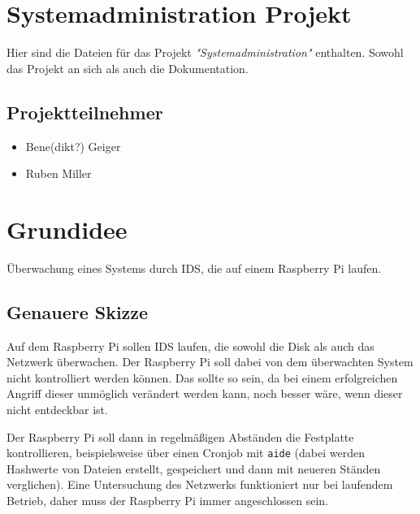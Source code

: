 \documentclass{article}
\begin{document}
\section{Systemadministration Projekt}

Hier sind die Dateien für das Projekt \textit{"Systemadministration"} enthalten. Sowohl das Projekt an sich als auch die Dokumentation.

\subsection{Projektteilnehmer}
\begin{itemize}
    \item Bene(dikt?) Geiger
    \item Ruben Miller
\end{itemize}

\section{Grundidee}

Überwachung eines Systems durch IDS, die auf einem Raspberry Pi laufen.

\subsection{Genauere Skizze}

Auf dem Raspberry Pi sollen IDS laufen, die sowohl die Disk als auch das Netzwerk überwachen. Der Raspberry Pi soll dabei von dem überwachten System nicht kontrolliert werden können. Das sollte so sein, da bei einem erfolgreichen Angriff dieser unmöglich verändert werden kann, noch besser wäre, wenn dieser nicht entdeckbar ist.

Der Raspberry Pi soll dann in regelmäßigen Abständen die Festplatte kontrollieren, beispielsweise über einen Cronjob mit \texttt{aide} (dabei werden Hashwerte von Dateien erstellt, gespeichert und dann mit neueren Ständen verglichen). Eine Untersuchung des Netzwerks funktioniert nur bei laufendem Betrieb, daher muss der Raspberry Pi immer angeschlossen sein.
\end{document}
